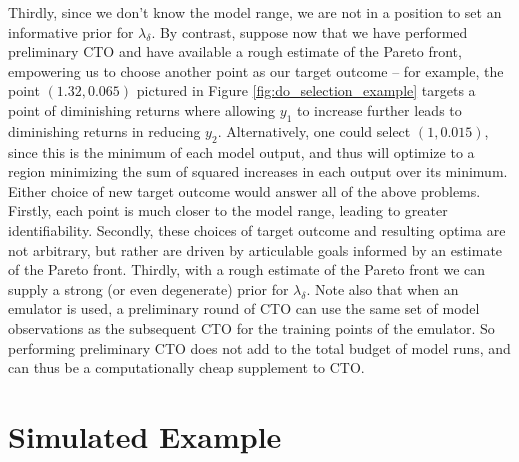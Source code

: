 \documentclass[12pt]{article}
\begin{document}
%
Thirdly, since we don't know the model range, we are not in a position to set an informative prior for $\lambda_\delta$.
%
By contrast, suppose now that we have performed preliminary CTO and have available a rough estimate of the Pareto front, empowering us to choose another point as our target outcome -- for example, the point $(1.32,0.065)$ pictured in Figure \ref{fig:do_selection_example} targets a point of diminishing returns where allowing $y_1$ to increase further leads to diminishing returns in reducing $y_2$.
%
Alternatively, one could select $(1,0.015)$, since this is the minimum of each model output, and thus will optimize to a region minimizing the sum of squared increases in each output over its minimum.
%
Either choice of new target outcome would answer all of the above problems.
%
Firstly, each point is much closer to the model range, leading to greater identifiability.
%
Secondly, these choices of target outcome and resulting optima are not arbitrary, but rather are driven by articulable goals informed by an estimate of the Pareto front.
%
Thirdly, with a rough estimate of the Pareto front we can supply a strong (or even degenerate) prior for $\lambda_\delta$.
%
Note also that when an emulator is used, a preliminary round of CTO can use the same set of model observations as the subsequent CTO for the training points of the emulator.
%
So performing preliminary CTO does not add to the total budget of model runs, and can thus be a computationally cheap supplement to CTO.
%

%
\section{Simulated Example}\label{example}
%
\end{document}
